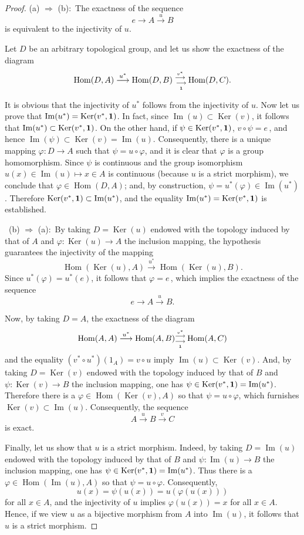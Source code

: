 \documentclass[12pt]{amsart}
\theoremstyle{theorem}
\theoremstyle{definition}
\theoremstyle{remark} \theoremstyle{question} \theoremstyle{example}
\def\vr{{\varphi}}
\def\Hom{\operatorname{{Hom}}}
\def\Ker{\operatorname{{Ker}}}
\def\mI{\operatorname{{Im}}}
\begin{document}
\begin{proof}
(a) $\Rightarrow$ (b):\, The exactness of the sequence
$$
e \longrightarrow A \overset{u}{\longrightarrow} B
$$
is equivalent to the injectivity of $u$.

Let $D$ be an arbitrary topological group, and let us show the exactness
of the diagram
$$
\Hom(D,A) \overset{u^*}{\longrightarrow} \Hom(D,B)^{\,\,\overset{v^*}{\longrightarrow}}_{\,\,\,\underset{\bf 1}{\longrightarrow}}\Hom(D,C).
$$

It is obvious that the injectivity of $u^*$ follows from the injectivity
of $u$. Now let us prove that ${\rm Im}(u^*) = \Ker(v^*,{\bf 1})$.
In fact, since $\mI(u) \subset \Ker(v)$, it follows that
$\mI(u^*) \subset \Ker(v^*,{\bf 1})$. On the other hand,
if $\psi \in \Ker(v^*,{\bf 1})$, $v \circ \psi = e$\,, and hence
$\mI(\psi) \subset \Ker(v) = \mI(u)$. Consequently, there is a unique
mapping $\vr\colon D \to A$ such that $\psi = u \circ \vr$, and it is clear
that $\vr$ is a group homomorphism. Since $\psi$ is continuous and the
group isomorphism $u(x) \in \mI(u) \mapsto x \in A$ is continuous
(because $u$ is a strict morphism), we conclude that $\vr \in \Hom(D,A)$;
and, by construction, $\psi = u^*(\vr) \in \mI(u^*)$. Therefore
$\Ker(v^*,{\bf 1}) \subset \mI(u^*)$, and the equality
$\mI(u^*) = \Ker(v^*,{\bf 1})$ is established.

\smallskip

\noindent\, (b) $\Rightarrow$ (a):\, By taking $D = \Ker(u)$ endowed with
the topology induced by that of $A$ and $\vr\colon \Ker(u) \to A$ the
inclusion mapping, the hypothesis guarantees the injectivity of the mapping
$$
\Hom(\Ker(u),A) \overset{u^*}{\longrightarrow} \Hom(\Ker(u),B).
$$
Since $u^*(\varphi)=u^*(e)$, it follows that $\vr = e$\,, which implies the
exactness of the sequence
$$
e \longrightarrow A \overset{u}{\longrightarrow} B.
$$

Now, by taking $D = A$, the exactness of the diagram
$$
\Hom(A,A) \overset{u^*}{\longrightarrow} \Hom(A,B)^{\overset{v^*}{\longrightarrow}}_{\underset{\bf 1}{\longrightarrow}} \Hom(A,C)
$$
and the equality $(v^* \circ u^*)(1_A) = v \circ u$ imply
$\mI(u) \subset \Ker(v)$. And, by taking $D = \Ker(v)$ endowed with the
topology induced by that of $B$ and $\psi\colon \Ker(v) \to B$ the inclusion
mapping, one has $\psi \in \Ker(v^*,{\bf 1}) = \mI(u^*)$. Therefore there is
a $\vr \in \Hom(\Ker(v),A)$ so that $\psi = u \circ \vr$, which furnishes
$\Ker(v) \subset \mI(u)$. Consequently, the sequence
$$
A \overset{u}{\longrightarrow} B \overset{v}{\longrightarrow} C
$$
is exact.

Finally, let us show that $u$ is a strict morphism. Indeed, by taking
$D = \mI(u)$ endowed with the topology induced by that of $B$ and
$\psi\colon \mI(u) \to B$ the inclusion mapping, one has
$\psi \in \Ker(v^*,{\bf 1}) = \mI(u^*)$. Thus there is a
$\vr \in \Hom(\mI(u),A)$ so that $\psi = u \circ \vr$. Consequently,
$$
u(x) = \psi(u(x)) = u(\vr(u(x)))
$$
for all $x \in A$, and the injectivity of $u$ implies $\vr(u(x)) = x$
for all $x \in A$. Hence, if we view $u$ as a bijective morphism from
$A$ into $\mI(u)$, it follows that $u$ is a strict morphism.
\end{proof}
\end{document}
